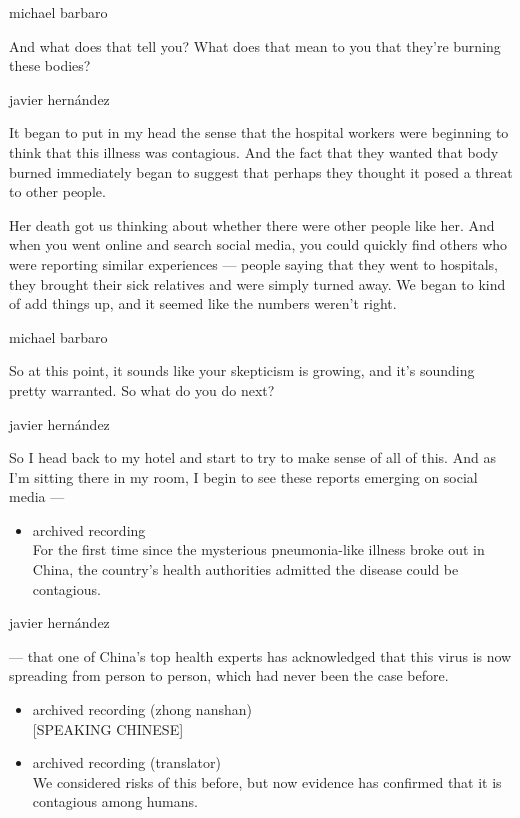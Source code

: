 michael barbaro

And what does that tell you? What does that mean to you that they're
burning these bodies?

javier hernández

It began to put in my head the sense that the hospital workers were
beginning to think that this illness was contagious. And the fact that
they wanted that body burned immediately began to suggest that perhaps
they thought it posed a threat to other people.

Her death got us thinking about whether there were other people like
her. And when you went online and search social media, you could quickly
find others who were reporting similar experiences --- people saying
that they went to hospitals, they brought their sick relatives and were
simply turned away. We began to kind of add things up, and it seemed
like the numbers weren't right.

michael barbaro

So at this point, it sounds like your skepticism is growing, and it's
sounding pretty warranted. So what do you do next?

javier hernández

So I head back to my hotel and start to try to make sense of all of
this. And as I'm sitting there in my room, I begin to see these reports
emerging on social media ---

\begin{itemize}
\tightlist
\item
  archived recording\\
  For the first time since the mysterious pneumonia-like illness broke
  out in China, the country's health authorities admitted the disease
  could be contagious.
\end{itemize}

javier hernández

--- that one of China's top health experts has acknowledged that this
virus is now spreading from person to person, which had never been the
case before.

\begin{itemize}
\item
  archived recording (zhong nanshan)\\
  {[}SPEAKING CHINESE{]}
\item
  archived recording (translator)\\
  We considered risks of this before, but now evidence has confirmed
  that it is contagious among humans.
\end{itemize}

